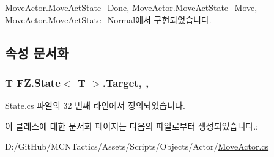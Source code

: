 \hyperlink{class_move_actor_1_1_move_act_state___done_a50f24c5382008b0205b7d5280880600f}{Move\+Actor.\+Move\+Act\+State\+\_\+\+Done}, \hyperlink{class_move_actor_1_1_move_act_state___move_a8eb57e77a4d5d6e1e0b2f6ccf8532d73}{Move\+Actor.\+Move\+Act\+State\+\_\+\+Move}, \hyperlink{class_move_actor_1_1_move_act_state___normal_ac679d09107c9471774c30ffc169b5ad0}{Move\+Actor.\+Move\+Act\+State\+\_\+\+Normal}에서 구현되었습니다.



\subsection{속성 문서화}
\subsubsection[{\texorpdfstring{Target}{Target}}]{\setlength{\rightskip}{0pt plus 5cm}T {\bf F\+Z.\+State}$<$ T $>$.Target\hspace{0.3cm}{\ttfamily [get]}, {\ttfamily [protected]}, {\ttfamily [inherited]}}\hypertarget{class_f_z_1_1_state_a6927f5c9f2517052f9dc5596188e9d95}{}\label{class_f_z_1_1_state_a6927f5c9f2517052f9dc5596188e9d95}


State.\+cs 파일의 32 번째 라인에서 정의되었습니다.



이 클래스에 대한 문서화 페이지는 다음의 파일로부터 생성되었습니다.\+:\begin{DoxyCompactItemize}
\item 
D\+:/\+Git\+Hub/\+M\+C\+N\+Tactics/\+Assets/\+Scripts/\+Objects/\+Actor/\hyperlink{_move_actor_8cs}{Move\+Actor.\+cs}\end{DoxyCompactItemize}
